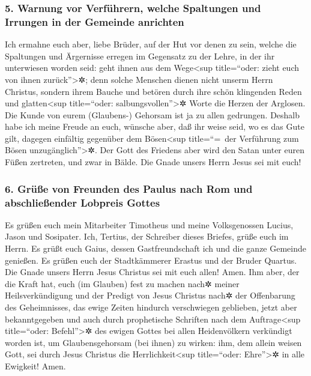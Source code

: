 \hypertarget{warnung-vor-verfuxfchrern-welche-spaltungen-und-irrungen-in-der-gemeinde-anrichten}{%
\subsubsection{5. Warnung vor Verführern, welche Spaltungen und Irrungen
in der Gemeinde
anrichten}\label{warnung-vor-verfuxfchrern-welche-spaltungen-und-irrungen-in-der-gemeinde-anrichten}}

 Ich ermahne euch aber, liebe Brüder, auf der Hut vor
denen zu sein, welche die Spaltungen und Ärgernisse erregen im Gegensatz
zu der Lehre, in der ihr unterwiesen worden seid: geht ihnen aus dem
Wege\textless sup title=``oder: zieht euch von ihnen
zurück''\textgreater✲;  denn solche Menschen dienen nicht
unserm Herrn Christus, sondern ihrem Bauche und betören durch ihre schön
klingenden Reden und glatten\textless sup title=``oder:
salbungsvollen''\textgreater✲ Worte die Herzen der Arglosen.
 Die Kunde von eurem (Glaubens-) Gehorsam ist ja zu allen
gedrungen. Deshalb habe ich meine Freude an euch, wünsche aber, daß ihr
weise seid, wo es das Gute gilt, dagegen einfältig gegenüber dem
Bösen\textless sup title=``=~der Verführung zum Bösen
unzugänglich''\textgreater✲.  Der Gott des Friedens aber
wird den Satan unter euren Füßen zertreten, und zwar in Bälde. Die Gnade
unsers Herrn Jesus sei mit euch!

\hypertarget{gruxfcuxdfe-von-freunden-des-paulus-nach-rom-und-abschlieuxdfender-lobpreis-gottes}{%
\subsubsection{6. Grüße von Freunden des Paulus nach Rom und
abschließender Lobpreis
Gottes}\label{gruxfcuxdfe-von-freunden-des-paulus-nach-rom-und-abschlieuxdfender-lobpreis-gottes}}

 Es grüßen euch mein Mitarbeiter Timotheus und meine
Volksgenossen Lucius, Jason und Sosipater.  Ich, Tertius,
der Schreiber dieses Briefes, grüße euch im Herrn.  Es
grüßt euch Gaius, dessen Gastfreundschaft ich und die ganze Gemeinde
genießen. Es grüßen euch der Stadtkämmerer Erastus und der Bruder
Quartus.  Die Gnade unsers Herrn Jesus Christus sei mit
euch allen! Amen.  Ihm aber, der die Kraft hat, euch (im
Glauben) fest zu machen nach✲ meiner Heilsverkündigung und der Predigt
von Jesus Christus nach✲ der Offenbarung des Geheimnisses, das ewige
Zeiten hindurch verschwiegen geblieben,  jetzt aber
bekanntgegeben und auch durch prophetische Schriften nach dem
Auftrage\textless sup title=``oder: Befehl''\textgreater✲ des ewigen
Gottes bei allen Heidenvölkern verkündigt worden ist, um
Glaubensgehorsam (bei ihnen) zu wirken:  ihm, dem allein
weisen Gott, sei durch Jesus Christus die Herrlichkeit\textless sup
title=``oder: Ehre''\textgreater✲ in alle Ewigkeit! Amen.
